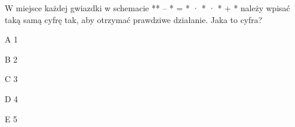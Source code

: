 \begin{tresc}
W miejsce każdej gwiazdki w schemacie ** – * = * · * · * + * należy wpisać taką samą cyfrę tak, aby otrzymać prawdziwe działanie. Jaka to cyfra?
\end{tresc}
\begin{wariant}{A} 1 \end{wariant}
\begin{wariant}{B} 2 \end{wariant}
\begin{wariant}{C} 3 \end{wariant}
\begin{wariant}{D} 4 \end{wariant}
\begin{wariant}{E} 5 \end{wariant}

